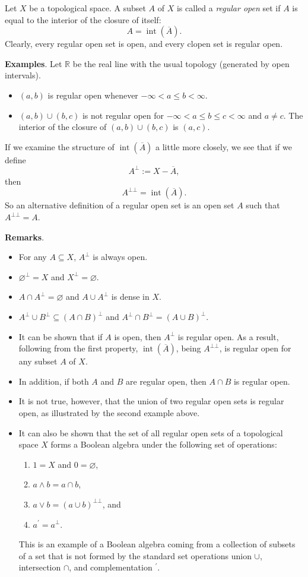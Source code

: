 \documentclass{article}
\begin{document}
Let $X$ be a topological space.  A subset $A$ of $X$ is called a
\emph{regular open} set if $A$ is equal to the interior of the closure of itself:
$$A=\operatorname{int}(\overline{A}).$$
Clearly, every regular open set is open, and every clopen set is regular open.

\textbf{Examples}.  Let $\mathbb{R}$ be the real line with the usual
topology (generated by open intervals).
\begin{itemize}
\item $(a,b)$ is regular open whenever $-\infty<a\leq b<\infty$.
\item $(a,b)\cup(b,c)$ is not regular open for $-\infty<a\leq b
\leq c<\infty$ and $a\neq c$.  The interior of the closure of
$(a,b)\cup(b,c)$ is $(a,c)$.
\end{itemize}

If we examine the structure of $\operatorname{int}(\overline{A})$ a
little more closely, we see that if we define
$$A^{\bot}:=X-\overline{A},$$ then $$A^{\bot\bot}=
\operatorname{int}(\overline{A}).$$  So an alternative definition of
a regular open set is an open set $A$ such that $A^{\bot\bot}=A$.

\textbf{Remarks}.
\begin{itemize}
\item For any $A\subseteq X$, $A^{\bot}$ is always open.
\item $\varnothing^{\bot}=X$ and $X^{\bot}=\varnothing$.
\item $A\cap A^{\bot}=\varnothing$ and $A\cup A^{\bot}$ is dense in
$X$.
\item $A^{\bot}\cup B^{\bot}\subseteq(A\cap
B)^{\bot}$ and $A^{\bot}\cap B^{\bot}=(A\cup B)^{\bot}$.
\item It can be shown that if $A$ is open, then $A^{\bot}$ is
regular open.  As a result, following from the first property, $\operatorname{int}(\overline{A})$, being $A^{\bot\bot}$, is regular open for any subset $A$ of $X$.
\item In addition, if both $A$ and $B$ are regular open, then $A\cap
B$ is regular open.
\item It is not true, however, that the union of two regular open
sets is regular open, as illustrated by the second example above.
\item It can also be shown that the set of all regular open sets of
a topological space $X$ forms a Boolean algebra under the following
set of operations:
\begin{enumerate}
\item $1=X$ and $0=\varnothing$,
\item $a\land b=a\cap b$,
\item $a\lor b=(a\cup b)^{\bot\bot}$, and
\item $a^{\prime}=a^{\bot}$.
\end{enumerate}
This is an example of a Boolean algebra coming from a collection of
subsets of a set that is not formed by the standard set operations
union $\cup$, intersection $\cap$, and complementation $^{\prime}$.
\end{itemize}
\end{document}
